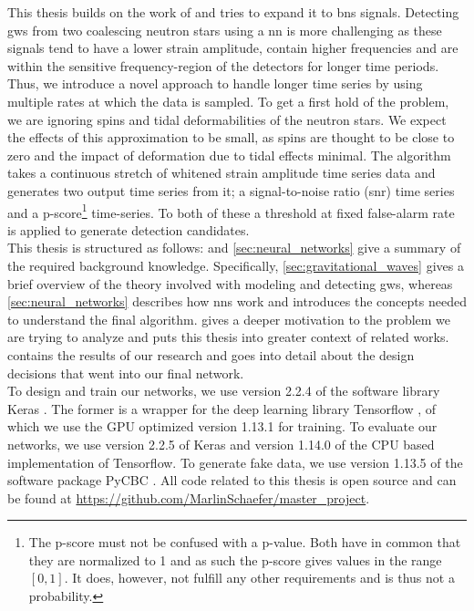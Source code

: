 This thesis builds on the work of \cite{original_deep_filtering} and tries to expand it to \gls{bns} signals. Detecting \gls{gw}s from two coalescing neutron stars using a \gls{nn} is more challenging as these signals tend to have a lower strain amplitude, contain higher frequencies and are within the sensitive frequency-region of the detectors for longer time periods. Thus, we introduce a novel approach to handle longer time series by using multiple rates at which the data is sampled. To get a first hold of the problem, we are ignoring spins and tidal deformabilities of the neutron stars. We expect the effects of this approximation to be small, as spins are thought to be close to zero and the impact of deformation due to tidal effects minimal. The algorithm takes a continuous stretch of whitened strain amplitude time series data and generates two output time series from it; a signal-to-noise ratio (\gls{snr}) time series and a p-score\footnote{The p-score must not be confused with a p-value. Both have in common that they are normalized to 1 and as such the p-score gives values in the range $\left[0,1\right]$. It does, however, not fulfill any other requirements and is thus not a probability.} time-series. To both of these a threshold at fixed false-alarm rate is applied to generate detection candidates.\medskip\\
This thesis is structured as follows:  and \autoref{sec:neural_networks} give a summary of the required background knowledge. Specifically, \autoref{sec:gravitational_waves} gives a brief overview of the theory involved with modeling and detecting \gls{gw}s, whereas \autoref{sec:neural_networks} describes how \gls{nn}s work and introduces the concepts needed to understand the final algorithm.  gives a deeper motivation to the problem we are trying to analyze and puts this thesis into greater context of related works.  contains the results of our research and goes into detail about the design decisions that went into our final network.\medskip\\
To design and train our networks, we use version 2.2.4 of the software library Keras \cite{keras}. The former is a wrapper for the deep learning library Tensorflow \cite{tensorflow}, of which we use the GPU optimized version 1.13.1 for training. To evaluate our networks, we use version 2.2.5 of Keras and version 1.14.0 of the CPU based implementation of Tensorflow. To generate fake data, we use version 1.13.5 of the software package PyCBC \cite{pycbc}. All code related to this thesis is open source and can be found at \url{https://github.com/MarlinSchaefer/master_project}.
